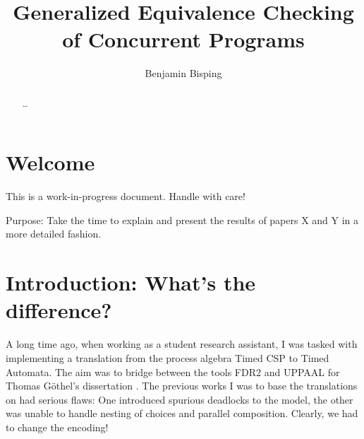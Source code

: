 \documentclass[
  a4paper,
]{report}
\title{Generalized Equivalence Checking of Concurrent Programs}
\author{Benjamin Bisping}
\date{}
\renewcommand*\contentsname{Table of contents}
\newcommand\contentsname{Table of contents}
\theoremstyle{plain}
\theoremstyle{plain}
\theoremstyle{definition}
\theoremstyle{plain}
\theoremstyle{definition}
\theoremstyle{remark}
\begin{document}
\maketitle
\begin{abstract}
\ldots{}
\end{abstract}

\renewcommand{\bibsection}{}

\renewcommand*\contentsname{Table of contents}
{
\hypersetup{linkcolor=}
\setcounter{tocdepth}{2}
\tableofcontents
}


\chapter*{Welcome}\label{welcome}


\begin{tcolorbox}[enhanced jigsaw, breakable, toprule=.15mm, toptitle=1mm, titlerule=0mm, colframe=quarto-callout-warning-color-frame, colbacktitle=quarto-callout-warning-color!10!white, left=2mm, rightrule=.15mm, colback=white, title=\textcolor{quarto-callout-warning-color}{\faExclamationTriangle}\hspace{0.5em}{Warning}, bottomrule=.15mm, opacitybacktitle=0.6, arc=.35mm, coltitle=black, leftrule=.75mm, bottomtitle=1mm, opacityback=0]

This is a work-in-progress document. Handle with care!

\end{tcolorbox}

Purpose: Take the time to explain and present the results of papers X
and Y in a more detailed fashion.


\chapter{Introduction: What's the
difference?}\label{introduction-whats-the-difference}

A long time ago, when working as a student research assistant, I was
tasked with implementing a translation from the process algebra Timed
CSP to Timed Automata. The aim was to bridge between the tools FDR2 and
UPPAAL for Thomas Göthel's dissertation
\citeyearpar{goethel12mechanicalVerificationRTS}. The previous works I
was to base the translations on had serious flaws: One introduced
spurious deadlocks to the model, the other was unable to handle nesting
of choices and parallel composition. Clearly, we had to change the
encoding!
\end{document}
